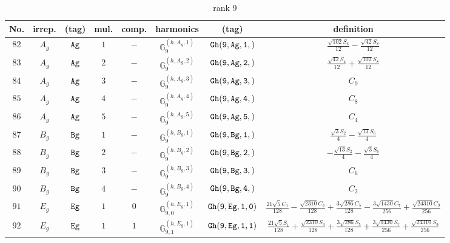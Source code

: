 \documentclass[fleqn,8pt]{jsarticle}
\begin{document}
\begin{table}[ht!]
\begin{center}
\caption{rank 9}
\renewcommand{\arraystretch}{1.3}
\begin{tabular}{cccccccc} \hline \hline
No. & irrep. & (tag) & mul. & comp. & harmonics & (tag) & definition \\ \hline
$ 82 $ & $ A_{g} $ & $ {\tt Ag} $ & $ 1 $ & $ - $ & $ \mathbb{G}_{9}^{(h,A_{g},1)} $ & $ {\tt Gh(9,Ag,1,)} $ & $ \frac{\sqrt{102} S_{4}}{12} - \frac{\sqrt{42} S_{8}}{12} $ \\
$ 83 $ & $ A_{g} $ & $ {\tt Ag} $ & $ 2 $ & $ - $ & $ \mathbb{G}_{9}^{(h,A_{g},2)} $ & $ {\tt Gh(9,Ag,2,)} $ & $ \frac{\sqrt{42} S_{4}}{12} + \frac{\sqrt{102} S_{8}}{12} $ \\
$ 84 $ & $ A_{g} $ & $ {\tt Ag} $ & $ 3 $ & $ - $ & $ \mathbb{G}_{9}^{(h,A_{g},3)} $ & $ {\tt Gh(9,Ag,3,)} $ & $ C_{0} $ \\
$ 85 $ & $ A_{g} $ & $ {\tt Ag} $ & $ 4 $ & $ - $ & $ \mathbb{G}_{9}^{(h,A_{g},4)} $ & $ {\tt Gh(9,Ag,4,)} $ & $ C_{8} $ \\
$ 86 $ & $ A_{g} $ & $ {\tt Ag} $ & $ 5 $ & $ - $ & $ \mathbb{G}_{9}^{(h,A_{g},5)} $ & $ {\tt Gh(9,Ag,5,)} $ & $ C_{4} $ \\
$ 87 $ & $ B_{g} $ & $ {\tt Bg} $ & $ 1 $ & $ - $ & $ \mathbb{G}_{9}^{(h,B_{g},1)} $ & $ {\tt Gh(9,Bg,1,)} $ & $ \frac{\sqrt{3} S_{2}}{4} - \frac{\sqrt{13} S_{6}}{4} $ \\
$ 88 $ & $ B_{g} $ & $ {\tt Bg} $ & $ 2 $ & $ - $ & $ \mathbb{G}_{9}^{(h,B_{g},2)} $ & $ {\tt Gh(9,Bg,2,)} $ & $ - \frac{\sqrt{13} S_{2}}{4} - \frac{\sqrt{3} S_{6}}{4} $ \\
$ 89 $ & $ B_{g} $ & $ {\tt Bg} $ & $ 3 $ & $ - $ & $ \mathbb{G}_{9}^{(h,B_{g},3)} $ & $ {\tt Gh(9,Bg,3,)} $ & $ C_{6} $ \\
$ 90 $ & $ B_{g} $ & $ {\tt Bg} $ & $ 4 $ & $ - $ & $ \mathbb{G}_{9}^{(h,B_{g},4)} $ & $ {\tt Gh(9,Bg,4,)} $ & $ C_{2} $ \\
$ 91 $ & $ E_{g} $ & $ {\tt Eg} $ & $ 1 $ & $ 0 $ & $ \mathbb{G}_{9,0}^{(h,E_{g},1)} $ & $ {\tt Gh(9,Eg,1,0)} $ & $ \frac{21 \sqrt{5} C_{1}}{128} - \frac{\sqrt{2310} C_{3}}{128} + \frac{3 \sqrt{286} C_{5}}{128} - \frac{3 \sqrt{1430} C_{7}}{256} + \frac{\sqrt{24310} C_{9}}{256} $ \\
$ 92 $ & $ E_{g} $ & $ {\tt Eg} $ & $ 1 $ & $ 1 $ & $ \mathbb{G}_{9,1}^{(h,E_{g},1)} $ & $ {\tt Gh(9,Eg,1,1)} $ & $ \frac{21 \sqrt{5} S_{1}}{128} + \frac{\sqrt{2310} S_{3}}{128} + \frac{3 \sqrt{286} S_{5}}{128} + \frac{3 \sqrt{1430} S_{7}}{256} + \frac{\sqrt{24310} S_{9}}{256} $ \\

\end{tabular}
\end{center}
\end{table}
\end{document}
